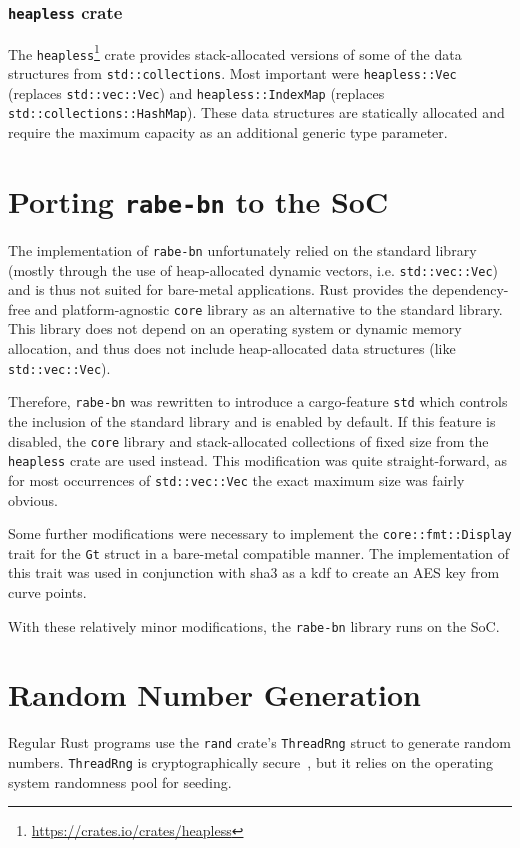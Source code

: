 \subsubsection{\texttt{heapless} crate}
The \texttt{heapless}\footnote{\url{https://crates.io/crates/heapless}} crate provides stack-allocated versions of some of the data structures from \texttt{std::collections}. 
Most important were \texttt{heapless::Vec} (replaces \texttt{std::vec::Vec}) and \texttt{heapless::IndexMap} (replaces \texttt{std::collections::HashMap}).
These data structures are statically allocated and require the maximum capacity as an additional generic type parameter.

\section{Porting \texttt{rabe-bn} to the SoC}

The implementation of \texttt{rabe-bn} unfortunately relied on the standard library (mostly through the use of heap-allocated dynamic vectors, i.e. \texttt{std::vec::Vec}) and is thus not suited for bare-metal applications.
Rust provides the dependency-free and platform-agnostic \texttt{core} library as an alternative to the standard library.
This library does not depend on an operating system or dynamic memory allocation, and thus does not include heap-allocated data structures (like \texttt{std::vec::Vec}).

Therefore, \texttt{rabe-bn} was rewritten to introduce a cargo-feature \texttt{std} which controls the inclusion of the standard library and is enabled by default.
If this feature is disabled, the \texttt{core} library and stack-allocated collections of fixed size from the \texttt{heapless} crate are used instead.
This modification was quite straight-forward, as for most occurrences of \texttt{std::vec::Vec} the exact maximum size was fairly obvious. %

Some further modifications were necessary to implement the \texttt{core::fmt::Display} trait for the \texttt{Gt} struct in a bare-metal compatible manner.
The implementation of this trait was used in conjunction with \acrshort{sha3} as a \gls{kdf} to create an AES key from curve points.

With these relatively minor modifications, the \texttt{rabe-bn} library runs on the SoC.

\section{Random Number Generation} %
Regular Rust programs use the \texttt{rand} \gls{crate}'s \verb+ThreadRng+ struct to generate random numbers.
\texttt{ThreadRng} is cryptographically secure~\cite{noauthor_rust_nodate}, but it relies on the operating system randomness pool for seeding.

